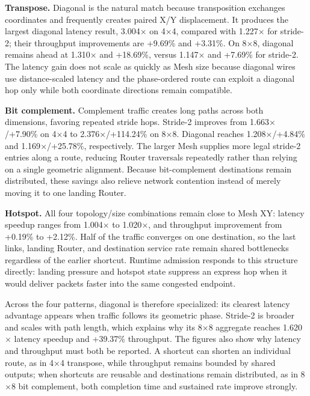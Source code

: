 \documentclass[10pt]{article}
\begin{document}
\noindent\textbf{Transpose.}
Diagonal is the natural match because transposition exchanges coordinates and
frequently creates paired X/Y displacement.  It produces the largest diagonal
latency result, 3.004$\times$ on 4$\times$4, compared with 1.227$\times$ for
stride-2; their throughput improvements are +9.69\% and +3.31\%.  On
8$\times$8, diagonal remains ahead at 1.310$\times$ and +18.69\%, versus
1.147$\times$ and +7.69\% for stride-2.  The latency gain does not scale as
quickly as Mesh size because diagonal wires use distance-scaled latency and
the phase-ordered route can exploit a diagonal hop only while both coordinate
directions remain compatible.

\noindent\textbf{Bit complement.}
Complement traffic creates long paths across both dimensions, favoring
repeated stride hops.  Stride-2 improves from 1.663$\times$/+7.90\% on
4$\times$4 to 2.376$\times$/+114.24\% on 8$\times$8.  Diagonal reaches
1.208$\times$/+4.84\% and 1.169$\times$/+25.78\%, respectively.  The larger
Mesh supplies more legal stride-2 entries along a route, reducing Router
traversals repeatedly rather than relying on a single geometric alignment.
Because bit-complement destinations remain distributed, these savings also
relieve network contention instead of merely moving it to one landing Router.

\noindent\textbf{Hotspot.}
All four topology/size combinations remain close to Mesh XY: latency speedup
ranges from 1.004$\times$ to 1.020$\times$, and throughput improvement from
+0.19\% to +2.12\%.  Half of the traffic converges on one destination, so the
last links, landing Router, and destination service rate remain shared
bottlenecks regardless of the earlier shortcut.  Runtime admission responds
to this structure directly: landing pressure and hotspot state suppress an
express hop when it would deliver packets faster into the same congested
endpoint.

Across the four patterns, diagonal is therefore specialized: its clearest
latency advantage appears when traffic follows its geometric phase.  Stride-2
is broader and scales with path length, which explains why its 8$\times$8
aggregate reaches 1.620$\times$ latency speedup and +39.37\% throughput.  The
figures also show why latency and throughput must both be reported.  A shortcut
can shorten an individual route, as in 4$\times$4 transpose, while throughput
remains bounded by shared outputs; when shortcuts are reusable and destinations
remain distributed, as in 8$\times$8 bit complement, both completion time and
sustained rate improve strongly.
\end{document}

